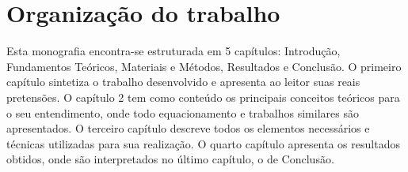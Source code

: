\section{Organização do trabalho}

Esta monografia encontra-se estruturada em 5 capítulos: Introdução, Fundamentos Teóricos, Materiais e Métodos, Resultados e Conclusão. O primeiro capítulo sintetiza o trabalho desenvolvido e apresenta ao leitor suas reais pretensões. O capítulo 2 tem como conteúdo os principais conceitos teóricos para o seu entendimento, onde todo equacionamento e trabalhos similares são apresentados. O terceiro capítulo descreve todos os elementos necessários e técnicas utilizadas para sua realização. O quarto capítulo apresenta os resultados obtidos, onde são interpretados no último capítulo, o de Conclusão.
